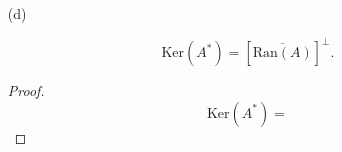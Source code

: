\documentclass[12pt]{amsart}
\newcommand{\eq}[1]{\begin{equation*}#1\end{equation*}}
\begin{document}
\begin{itemize}
    \begin{proof}
        For the first part of this claim, $(A+B)^*$ has the defining property
        \eq{\langle (A+B)x, y \rangle = \langle x, (A+B)^*y \rangle, \text{ for all } x, y \in \mathscr{H}.}
        Then by linearity of the inner product, we know that 
        \eq{A\langle x, y \rangle + B \langle x, y\rangle = \langle x, A^*y \rangle + \langle x, B^*y \rangle.}
        This implies that $(A + B)^* = A^* + B^*$.
    \end{proof}

    \item [(d)]
    
    \eq{\text{Ker}(A^*) = [\overline{\text{Ran} (A)}]^\bot.}

    \begin{proof}
        \eq{\text{Ker}(A^*) = }
    \end{proof}
\end{itemize}
\end{document}
